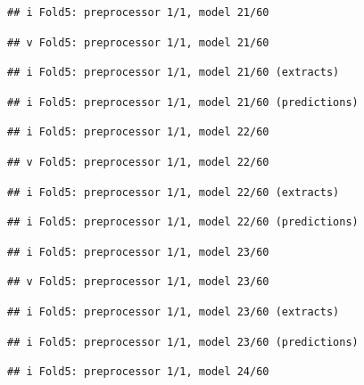 \documentclass[
]{article}
\begin{document}
\begin{verbatim}
## i Fold5: preprocessor 1/1, model 21/60
\end{verbatim}

\begin{verbatim}
## v Fold5: preprocessor 1/1, model 21/60
\end{verbatim}

\begin{verbatim}
## i Fold5: preprocessor 1/1, model 21/60 (extracts)
\end{verbatim}

\begin{verbatim}
## i Fold5: preprocessor 1/1, model 21/60 (predictions)
\end{verbatim}

\begin{verbatim}
## i Fold5: preprocessor 1/1, model 22/60
\end{verbatim}

\begin{verbatim}
## v Fold5: preprocessor 1/1, model 22/60
\end{verbatim}

\begin{verbatim}
## i Fold5: preprocessor 1/1, model 22/60 (extracts)
\end{verbatim}

\begin{verbatim}
## i Fold5: preprocessor 1/1, model 22/60 (predictions)
\end{verbatim}

\begin{verbatim}
## i Fold5: preprocessor 1/1, model 23/60
\end{verbatim}

\begin{verbatim}
## v Fold5: preprocessor 1/1, model 23/60
\end{verbatim}

\begin{verbatim}
## i Fold5: preprocessor 1/1, model 23/60 (extracts)
\end{verbatim}

\begin{verbatim}
## i Fold5: preprocessor 1/1, model 23/60 (predictions)
\end{verbatim}

\begin{verbatim}
## i Fold5: preprocessor 1/1, model 24/60
\end{verbatim}
\end{document}
